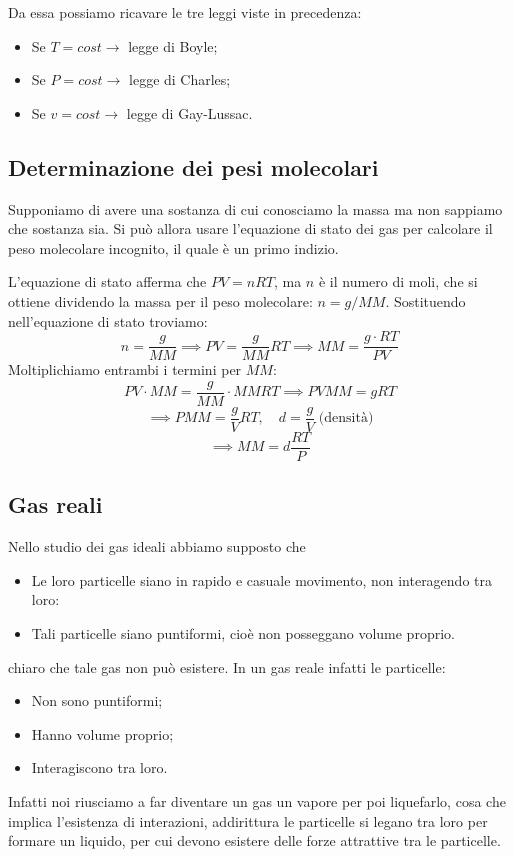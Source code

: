 Da essa possiamo ricavare le tre leggi viste in precedenza:

\begin{itemize}
    \item Se $T=cost \rightarrow$ legge di Boyle;
    \item Se $P=cost \rightarrow$ legge di Charles;
    \item Se $v=cost \rightarrow$ legge di Gay-Lussac.
\end{itemize}
\subsection{Determinazione dei pesi molecolari}
Supponiamo di avere una sostanza di cui conosciamo la massa ma non sappiamo che sostanza sia. Si può allora usare l'equazione di stato dei gas per calcolare il peso molecolare incognito, il quale è un primo indizio.

L'equazione di stato afferma che $PV=nRT$, ma $n$ è il numero di moli, che si ottiene dividendo la massa per il peso molecolare: $n=g/MM$. Sostituendo nell'equazione di stato troviamo:
$$n=\frac{g}{MM} \implies PV=\frac{g}{MM}RT \implies MM=\frac{g \cdot RT}{PV}$$
Moltiplichiamo entrambi i termini per $MM$:
$$PV \cdot MM=\frac{g}{MM}\cdot MM RT \implies PV MM = gRT$$
$$ \implies PMM = \frac{g}{V}RT, \quad d=\frac{g}{V} \; \text{(densità)}$$
$$\implies MM = d \frac{RT}{P}$$
\subsection{Gas reali}
Nello studio dei gas ideali abbiamo supposto che

\begin{itemize}
    \item Le loro particelle siano in rapido e casuale movimento, non interagendo tra loro:
    \item Tali particelle siano puntiformi, cioè non posseggano volume proprio.
\end{itemize}

\E chiaro che tale gas non può esistere. In un gas reale infatti le particelle:

\begin{itemize}
    \item Non sono puntiformi;
    \item Hanno volume proprio;
    \item Interagiscono tra loro. 
\end{itemize}

Infatti noi riusciamo a far diventare un gas un vapore per poi liquefarlo, cosa che implica l'esistenza di interazioni, addirittura le particelle si legano tra loro per formare un liquido, per cui devono esistere delle forze attrattive tra le particelle.

